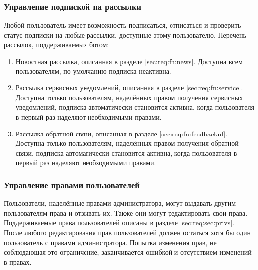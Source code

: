    \subsubsection{Управление подпиской на рассылки}
        \label{sec:req:fn:subscriptions}
        Любой пользователь имеет возможность подписаться, отписаться и проверить статус подписки на
        любые рассылки, доступные этому пользователю. Перечень рассылок, поддерживаемых ботом:
        \begin{enumerate}
            \item
                Новостная рассылка, описанная в разделе \ref{sec:req:fn:news}.
                Доступна всем пользователям, по умолчанию подписка неактивна.
            \item
                Рассылка сервисных уведомлений, описанная в разделе \ref{sec:req:fn:service}.
                Доступна только пользователям, наделённых правом получения сервисных уведомлений,
                подписка автоматически становится активна, когда пользователя в первый
                раз наделяют необходимыми правами.
            \item
                Рассылка обратной связи, описанная в разделе \ref{sec:req:fn:feedbacknl}.
                Доступна только пользователям, наделённых правом получения обратной связи,
                подписка автоматически становится активна, когда пользователя в первый
                раз наделяют необходимыми правами.
        \end{enumerate}

    \subsubsection{Управление правами пользователей}
        \label{seq:req:fn:roles}
        Пользователи, наделённые правами администратора, могут выдавать другим
        пользователям права и отзывать их. Также они могут редактировать свои права.
        Поддерживаемые права пользователей описаны в разделе \ref{sec:req:sec:privs}.
        После любого редактирования прав пользователей должен остаться хотя бы один
        пользователь с правами администратора. Попытка изменения прав, не соблюдающая
        это ограничение, заканчивается ошибкой и отсутствием изменений в правах.

